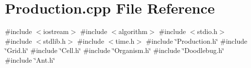 \section{Production.\+cpp File Reference}
\label{Production_8cpp}
{\ttfamily \#include $<$iostream$>$}\newline
{\ttfamily \#include $<$algorithm$>$}\newline
{\ttfamily \#include $<$stdio.\+h$>$}\newline
{\ttfamily \#include $<$stdlib.\+h$>$}\newline
{\ttfamily \#include $<$time.\+h$>$}\newline
{\ttfamily \#include \char`\"{}Production.\+h\char`\"{}}\newline
{\ttfamily \#include \char`\"{}Grid.\+h\char`\"{}}\newline
{\ttfamily \#include \char`\"{}Cell.\+h\char`\"{}}\newline
{\ttfamily \#include \char`\"{}Organism.\+h\char`\"{}}\newline
{\ttfamily \#include \char`\"{}Doodlebug.\+h\char`\"{}}\newline
{\ttfamily \#include \char`\"{}Ant.\+h\char`\"{}}\newline
